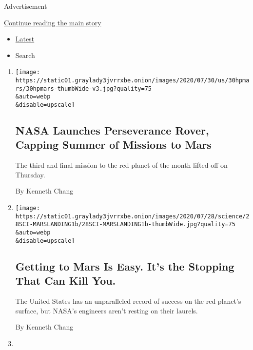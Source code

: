 Advertisement

\protect\hyperlink{after-subheader}{Continue reading the main story}

\begin{itemize}
\tightlist
\item
  \protect\hyperlink{stream-panel}{Latest}
\item
  Search
\end{itemize}

\begin{enumerate}
\def\labelenumi{\arabic{enumi}.}
\item
  \href{/2020/07/30/science/nasa-mars-launch.html}{}

  \texttt{[image: https://static01.graylady3jvrrxbe.onion/images/2020/07/30/us/30hpmars/30hpmars-thumbWide-v3.jpg?quality=75\\\&auto=webp\\\&disable=upscale]}

  \hypertarget{nasa-launches-perseverance-rover-capping-summer-of-missions-to-mars}{%
  \subsection{NASA Launches Perseverance Rover, Capping Summer of
  Missions to
  Mars}\label{nasa-launches-perseverance-rover-capping-summer-of-missions-to-mars}}

  The third and final mission to the red planet of the month lifted off
  on Thursday.

  By Kenneth Chang
\item
  \href{/2020/07/29/science/nasa-mars-perseverance-rover.html}{}

  \texttt{[image: https://static01.graylady3jvrrxbe.onion/images/2020/07/28/science/28SCI-MARSLANDING1b/28SCI-MARSLANDING1b-thumbWide.jpg?quality=75\\\&auto=webp\\\&disable=upscale]}

  \hypertarget{getting-to-mars-is-easy-its-the-stopping-that-can-kill-you}{%
  \subsection{Getting to Mars Is Easy. It's the Stopping That Can Kill
  You.}\label{getting-to-mars-is-easy-its-the-stopping-that-can-kill-you}}

  The United States has an unparalleled record of success on the red
  planet's surface, but NASA's engineers aren't resting on their
  laurels.

  By Kenneth Chang
\item
  \href{/2020/07/28/science/mars-sample-return-mission.html}{}


\end{enumerate}
